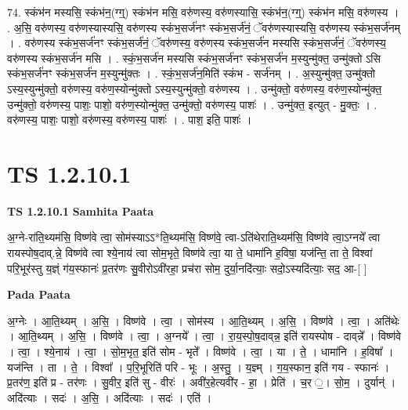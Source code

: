 \documentclass[17pt]{extarticle}
\begin{document}
74. स्कंभ॑न मस्यसि॒ स्कंभ॑न॒(ग्ग्॒) स्कंभ॑न मसि॒ वरु॑णस्य॒ वरु॑णस्यासि॒ स्कंभ॑न॒(ग्ग्॒) स्कंभ॑न मसि॒ वरु॑णस्य । . अ॒सि॒ वरु॑णस्य॒ वरु॑णस्यास्यसि॒ वरु॑णस्य स्कंभ॒सर्ज॑नꣳ स्कंभ॒सर्ज॑नं॒ ॅवरु॑णस्यास्यसि॒ वरु॑णस्य स्कंभ॒सर्ज॑नम् । . वरु॑णस्य स्कंभ॒सर्ज॑नꣳ स्कंभ॒सर्ज॑नं॒ ॅवरु॑णस्य॒ वरु॑णस्य स्कंभ॒सर्ज॑न मस्यसि स्कंभ॒सर्ज॑नं॒ ॅवरु॑णस्य॒ वरु॑णस्य स्कंभ॒सर्ज॑न मसि । . स्कं॒भ॒सर्ज॑न मस्यसि स्कंभ॒सर्ज॑नꣳ स्कंभ॒सर्ज॑न म॒स्युन्मु॑क्त॒ उन्मु॑क्तो ऽसि स्कंभ॒सर्ज॑नꣳ स्कंभ॒सर्ज॑न म॒स्युन्मु॑क्तः । . स्कं॒भ॒सर्ज॑न॒मिति॑ स्कंभ - सर्ज॑नम् । . अ॒स्युन्मु॑क्त॒ उन्मु॑क्तो ऽस्य॒स्युन्मु॑क्तो॒ वरु॑णस्य॒ वरु॑ण॒स्योन्मु॑क्तो ऽस्य॒स्युन्मु॑क्तो॒ वरु॑णस्य । . उन्मु॑क्तो॒ वरु॑णस्य॒ वरु॑ण॒स्योन्मु॑क्त॒ उन्मु॑क्तो॒ वरु॑णस्य॒ पाशः॒ पाशो॒ वरु॑ण॒स्योन्मु॑क्त॒ उन्मु॑क्तो॒ वरु॑णस्य॒ पाशः॑ । . उन्मु॑क्त॒ इत्युत् - मु॒क्तः॒ । . वरु॑णस्य॒ पाशः॒ पाशो॒ वरु॑णस्य॒ वरु॑णस्य॒ पाशः॑ । . पाश॒ इति॒ पाशः॑ । \newline
\pagebreak
{}

\section{ TS 1.2.10.1 }

\textbf{TS 1.2.10.1 } \newline
\textbf{Samhita Paata} \newline

अ॒ग्ने-रा॑ति॒थ्यम॑सि॒ विष्ण॑वे त्वा॒ सोम॑स्याऽऽ*ति॒थ्यम॑सि॒ विष्ण॑वे॒ त्वा-ऽति॑थेराति॒थ्यम॑सि॒ विष्ण॑वे त्वा॒ऽग्नये᳚ त्वा रायस्पोष॒दाव्.न्ने॒ विष्ण॑वे त्वा श्ये॒नाय॑ त्वा सोम॒भृते॒ विष्ण॑वे त्वा॒ या ते॒ धामा॑नि ह॒विषा॒ यज॑न्ति॒ ता ते॒ विश्वा॑ परि॒भूर॑स्तु य॒ज्ञ्ं ग॑य॒स्फानः॑ प्र॒तर॑णः सु॒वीरोऽवी॑रहा॒ प्रच॑रा सोम॒ दुर्या॒नदि॑त्याः॒ सदो॒ऽस्यदि॑त्याः॒ सद॒ आ-[ ] \newline

\textbf{Pada Paata} \newline

अ॒ग्नेः । आ॒ति॒थ्यम् । अ॒सि॒ । विष्ण॑वे । त्वा॒ । सोम॑स्य । आ॒ति॒थ्यम् । अ॒सि॒ । विष्ण॑वे । त्वा॒ । अति॑थेः । आ॒ति॒थ्यम् । अ॒सि॒ । विष्ण॑वे । त्वा॒ । अ॒ग्नये᳚ । त्वा॒ । रा॒य॒स्पो॒ष॒दाव्‌न्न॒ इति॑ रायस्पोष - दाव्‌न्ने᳚ । विष्ण॑वे । त्वा॒ । श्ये॒नाय॑ । त्वा॒ । सो॒म॒भृत॒ इति॑ सोम - भृते᳚ । विष्ण॑वे । त्वा॒ । या । ते॒ । धामा॑नि । ह॒विषा᳚ । यज॑न्ति । ता । ते॒ । विश्वा᳚ । प॒रि॒भूरिति॑ परि - भूः । अ॒स्तु॒ । य॒ज्ञ्म् । ग॒य॒स्फान॒ इति॑ गय - स्फानः॑ । प्र॒तर॑ण॒ इति॑ प्र - तर॑णः । सु॒वीर॒ इति॑ सु - वीरः॑ । अवी॑र॒हेत्यवी॑र - हा॒ । प्रेति॑ । च॒र ॒। सो॒म॒ । दुर्यान्॑ । अदि॑त्याः । सदः॑ । अ॒सि॒ । अदि॑त्याः । सदः॑ । एति॑ ।  \newline
\end{document}
